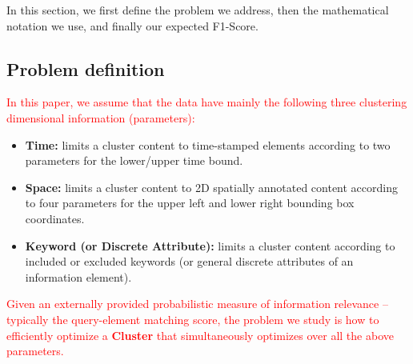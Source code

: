 In this section, we first define the problem we address, then the mathematical notation we use, and finally our  expected F1-Score.



\subsection{Problem definition}

\textcolor{red}{ In this paper, we assume that the data have mainly the following three clustering dimensional information (parameters):}
\begin{itemize}
\item {\bf Time:} limits a cluster content to time-stamped elements according to two parameters for the lower/upper time bound. 
\item {\bf Space:} limits a cluster content to 2D spatially annotated content according to four parameters for the upper left and lower right bounding box coordinates.
\item {\bf Keyword (or Discrete Attribute):} limits a  cluster content according to included or excluded keywords (or general discrete attributes of an information element).
\end{itemize}
\textcolor{red}{ Given an externally provided probabilistic measure of information relevance -- typically the query-element matching score, 
the problem we study is how to efficiently optimize a {\bf Cluster} that simultaneously optimizes over all the above parameters.} 


